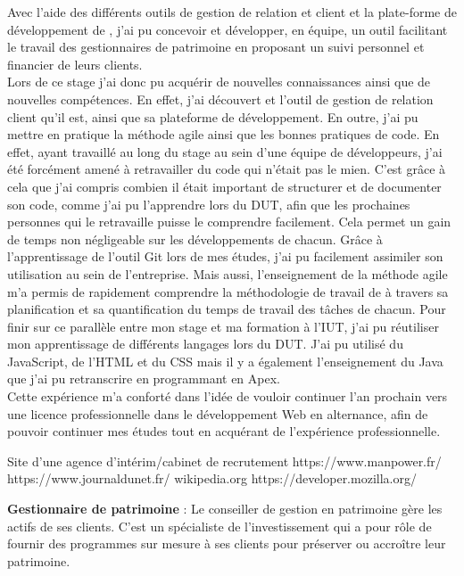 \documentclass[12pt,oneside,noprintercorrection]{iut}
\begin{document}
Avec l'aide des différents outils de gestion de relation et client et la plate-forme de développement de \slf{}, j'ai pu concevoir et développer, en équipe, un outil facilitant le travail des gestionnaires de patrimoine en proposant un suivi personnel et financier de leurs clients.
~\\\indent Lors de ce stage j'ai donc pu acquérir de nouvelles connaissances ainsi que de nouvelles compétences. En effet, j'ai découvert \slf{} et l'outil de gestion de relation client qu'il est, ainsi que sa plateforme de développement. En outre, j'ai pu mettre en pratique la méthode agile ainsi que les bonnes pratiques de code. En effet, ayant travaillé au long du stage au sein d'une équipe de développeurs, j'ai été forcément amené à retravailler du code qui n'était pas le mien. C'est grâce à cela que j'ai compris combien il était important de structurer et de documenter son code, comme j'ai pu l'apprendre lors du DUT, afin que les prochaines personnes qui le retravaille puisse le comprendre facilement. Cela permet un gain de temps non négligeable sur les développements de chacun. Grâce à l'apprentissage de l'outil Git lors de mes études, j'ai pu facilement assimiler son utilisation au sein de l'entreprise. Mais aussi, l'enseignement de la méthode agile m'a permis de rapidement comprendre la méthodologie de travail de \gz{} à travers sa planification et sa quantification du temps de travail des tâches de chacun. Pour finir sur ce parallèle entre mon stage et ma formation à l'IUT, j'ai pu réutiliser mon apprentissage de différents langages lors du DUT. J'ai pu utilisé du JavaScript, de l'HTML et du CSS mais il y a également l'enseignement du Java que j'ai pu retranscrire en programmant en Apex.
~\\\indent Cette expérience m'a conforté dans l'idée de vouloir continuer l'an prochain vers une licence professionnelle dans le développement Web en alternance, afin de pouvoir continuer mes études tout en acquérant de l'expérience professionnelle. 


\small

Site d'une agence d'intérim/cabinet de recrutement https://www.manpower.fr/ \newline
https://www.journaldunet.fr/ \newline
wikipedia.org \newline
https://developer.mozilla.org/


\newpage
{}
    \textbf{Gestionnaire de patrimoine} : Le conseiller de gestion en patrimoine gère les actifs de ses clients. C’est un spécialiste de l’investissement qui a pour rôle de fournir des programmes sur mesure à ses clients pour préserver ou accroître leur patrimoine.\newline
    
\end{document}

